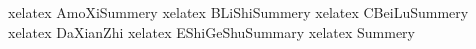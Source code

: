 xelatex AmoXiSummery
xelatex BLiShiSummery
xelatex CBeiLuSummery
xelatex DaXianZhi
xelatex EShiGeShuSummary
xelatex Summery

